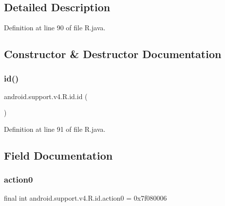 \subsection{Detailed Description}


Definition at line 90 of file R.\+java.



\subsection{Constructor \& Destructor Documentation}
\mbox{\label{classandroid_1_1support_1_1v4_1_1_r_1_1id_a41674462355e6ba38d31dbbabe96adc1}} 
\subsubsection{\texorpdfstring{id()}{id()}}
{\footnotesize\ttfamily android.\+support.\+v4.\+R.\+id.\+id (\begin{DoxyParamCaption}{ }\end{DoxyParamCaption})\hspace{0.3cm}{\ttfamily [private]}}



Definition at line 91 of file R.\+java.


\begin{DoxyCode}{0}

\end{DoxyCode}


\subsection{Field Documentation}
\mbox{\label{classandroid_1_1support_1_1v4_1_1_r_1_1id_ad7592f41400f9252a235131ada4828fb}} 
\subsubsection{\texorpdfstring{action0}{action0}}
{\footnotesize\ttfamily final int android.\+support.\+v4.\+R.\+id.\+action0 = 0x7f080006\hspace{0.3cm}{\ttfamily [static]}}



